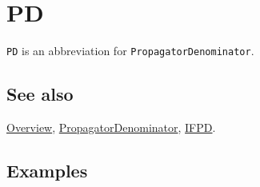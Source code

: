 \documentclass[../FeynCalcManual.tex]{subfiles}
\begin{document}
\hypertarget{pd}{
\section{PD}\label{pd}}

\texttt{PD} is an abbreviation for \texttt{PropagatorDenominator}.

\subsection{See also}

\hyperlink{toc}{Overview},
\hyperlink{propagatordenominator}{PropagatorDenominator},
\hyperlink{ifpd}{IFPD}.

\subsection{Examples}
\end{document}

